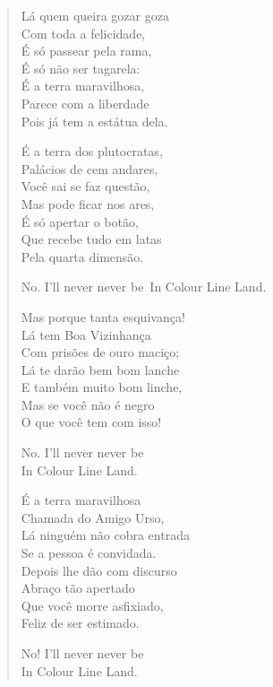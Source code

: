 {\begin{verse}
Lá quem queira gozar goza\\
Com toda a felicidade,\\
É só passear pela rama,\\
É só não ser tagarela:\\
É a terra maravilhosa,\\
Parece com a liberdade\\
Pois já tem a estátua dela.

É a terra dos plutocratas,\\
Palácios de cem andares,\\
Você sai se faz questão,\\
Mas pode ficar nos ares,\\
É só apertar o botão,\\
Que recebe tudo em latas\\
Pela quarta dimensão.

\qquad No. I'll never never be\
\qquad In Colour Line Land.

Mas porque tanta esquivança!\\
Lá tem Boa Vizinhança\\
Com prisões de ouro maciço;\\
Lá te darão bem bom lanche\\
E também muito bom linche,\\
Mas se você não é negro\\
O que você tem com isso!

\qquad No. I'll never never be\\
\qquad In Colour Line Land.

É a terra maravilhosa\\
Chamada do Amigo Urso,\\
Lá ninguém não cobra entrada\\
Se a pessoa é convidada.\\
Depois lhe dão com discurso\\
Abraço tão apertado\\
Que você morre asfixiado,\\
Feliz de ser estimado.

\qquad No! I'll never never be\\
\qquad In Colour Line Land.
\end{verse}


}
